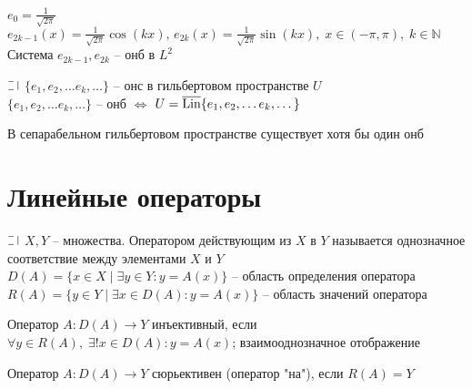 \begin{theorem}
  $e_0 = \frac{1}{\sqrt{2\pi}}$\\
  $e_{2k-1}(x) = \frac{1}{\sqrt{2\pi}} \cos(kx), \, e_{2k}(x) = \frac{1}{\sqrt{2\pi}}\sin(kx), \; x \in (-\pi, \pi), \; k \in \mathbb{N}$\\
  Система $e_{2k-1}, e_{2k}$ -- онб в $L^2$
\end{theorem}

\begin{theorem}
  $\letus$ $\{e_1, e_2, \dots e_k, \dots\}$ -- онс в гильбертовом пространстве $U$\\
  $\{e_1, e_2, \dots e_k, \dots\}$ -- онб $\Longleftrightarrow$ $U = \overline{\text{Lin}}\{e_1, e_2, \dots e_k, \dots\}$
\end{theorem}

\begin{theorem}
  В сепарабельном гильбертовом пространстве существует хотя бы один онб
\end{theorem}

\section*{Линейные операторы}

\begin{definition}
  $\letus$ $X, Y$ -- множества.
  Оператором действующим из $X$ в $Y$ называется однозначное соответствие между элементами $X$ и $Y$\\
  $D(A) = \{x \in X \mid \exists y \in Y: y = A(x)\}$ -- область определения оператора\\
  $R(A) = \{y \in Y \mid \exists x \in D(A): y = A(x)\}$ -- область значений оператора
\end{definition}

\begin{definition}
  Оператор $A: D(A) \rightarrow Y$ инъективный, если \\
  $\forall y \in R(A), \; \exists! x \in D(A): y = A(x)$; взаимооднозначное отображение
\end{definition}

\begin{definition}
  Оператор $A: D(A) \rightarrow Y$ сюрьективен (оператор "на"), если $R(A) = Y$
\end{definition}

